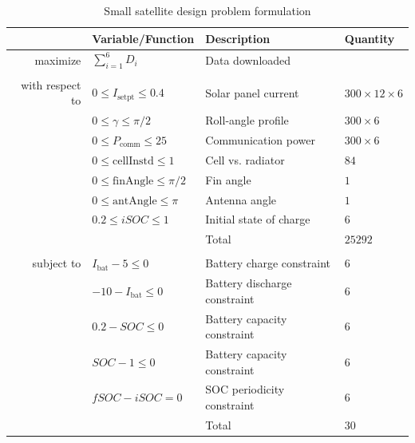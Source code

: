 \documentclass[]{aiaa-tc} %
\begin{document}
    \begin{table}
        \centering
        \caption{Small satellite design problem formulation}
        \begin{tabular}{r l l l}
            \toprule
            & Variable/Function & Description & Quantity \\
            \midrule
            maximize            & $\sum_{i=1}^6 D_i$ & Data downloaded \\
            \\
            with respect to & $0 \le I_\text{setpt} \le 0.4$ & Solar panel current & $300 \times 12 \times 6$ \\
                                    & $0 \le \gamma \le \pi / 2$ & Roll-angle profile & $300 \times 6$ \\
                                    & $0 \le P_\text{comm} \le 25$ & Communication power & $300 \times 6$ \\
                                    & $0 \le \text{cellInstd} \le 1$ & Cell vs. radiator & $84$ \\
                                    & $0 \le \text{finAngle} \le \pi / 2$ & Fin angle & $1$ \\
                                    & $0 \le \text{antAngle} \le \pi$ & Antenna angle & $1$ \\
                                    & $0.2 \le iSOC \le 1$ & Initial state of charge & $6$ \\
                                    & & Total & $25292$ \\
            \\
            subject to          & $I_\text{bat} - 5 \le 0$ & Battery charge constraint & $6$ \\
                                    & $-10 - I_\text{bat} \le 0$ & Battery discharge constraint & $6$ \\
                                    & $0.2 - SOC \le 0$ & Battery capacity constraint & $6$ \\
                                    & $SOC - 1 \le 0$ & Battery capacity constraint & $6$ \\
                                    & $fSOC - iSOC = 0$ & SOC periodicity constraint & $6$ \\
                                    & & Total & $30$ \\
            \bottomrule
        \end{tabular}

        \label{eqn:cadre_formulation}
    \end{table}
\end{document}
